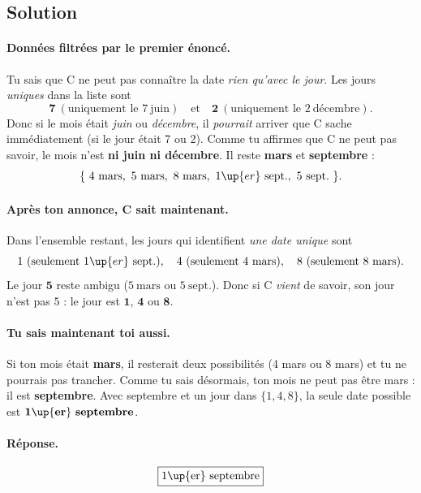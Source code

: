 \subsection*{Solution}

\paragraph{Données filtrées par le premier énoncé.}
Tu sais que C ne peut pas connaître la date \emph{rien qu’avec le jour}. Les jours \emph{uniques} dans la liste sont
\[
\textbf{7} \ (\text{uniquement le } 7~\text{juin}) \quad \text{et} \quad \textbf{2} \ (\text{uniquement le } 2~\text{décembre}).
\]
Donc si le mois était \emph{juin} ou \emph{décembre}, il \emph{pourrait} arriver que C sache immédiatement (si le jour était 7 ou 2).
Comme tu affirmes que C ne peut pas savoir, le mois n’est \textbf{ni juin ni décembre}.
Il reste \textbf{mars} et \textbf{septembre} :
\[
\{\ 4~\text{mars},~5~\text{mars},~8~\text{mars},~1\up{er}~\text{sept.},~5~\text{sept.}\ \}.
\]

\paragraph{Après ton annonce, C sait maintenant.}
Dans l’ensemble restant, les jours qui identifient \emph{une date unique} sont
\[
1 \ (\text{seulement } 1\up{er}~\text{sept.}),\quad
4 \ (\text{seulement } 4~\text{mars}),\quad
8 \ (\text{seulement } 8~\text{mars}).
\]
Le jour \(\mathbf{5}\) reste ambigu (\(5~\text{mars}\) ou \(5~\text{sept.}\)).
Donc si C \emph{vient} de savoir, son jour n’est pas \(5\) : le jour est \(\mathbf{1}\), \(\mathbf{4}\) ou \(\mathbf{8}\).

\paragraph{Tu sais maintenant toi aussi.}
Si ton mois était \textbf{mars}, il resterait deux possibilités (4 mars ou 8 mars) et tu ne pourrais pas trancher.
Comme tu sais désormais, ton mois ne peut pas être mars : il est \textbf{septembre}.
Avec septembre et un jour dans \(\{1,4,8\}\), la seule date possible est \(\mathbf{1\up{er}~septembre}\).

\paragraph{Réponse.}
\[
\boxed{\text{1\up{er} septembre}}
\]





